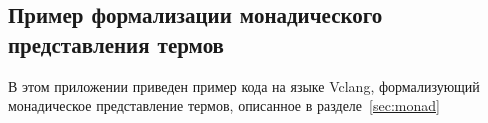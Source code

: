 \begin{appendices}

\section{Пример формализации монадического представления термов}
\label{apendix:monad}
В этом приложении приведен пример кода на языке Vclang, формализующий монадическое представление термов, описанное в разделе~\ref{sec:monad}

\inputminted[breaklines=true, fontsize=\scriptsize]{text}{code/properties.hs}

\end{appendices}

